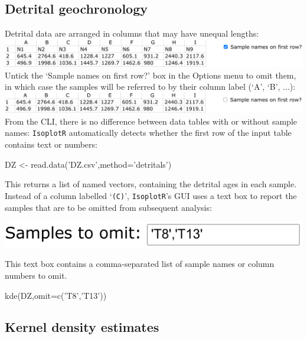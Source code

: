\begin{refsection}

\chapter{Detrital geochronology}\label{ch:detrital-R}

Detrital data are arranged in columns that may have unequal lengths:\\

\noindent\includegraphics[width=\linewidth]{../figures/detritalInputTable.png}\\

Untick the `Sample names on first row?' box in the Options menu to
omit them, in which case the samples will be referred to by their
column label (`A', `B', ...):\\

\noindent\includegraphics[width=\linewidth]{../figures/detritalInputTableWithoutNames.png}\\

From the CLI, there is no difference between data tables with or
without sample names: \texttt{IsoplotR} automatically detects whether
the first row of the input table contains text or numbers:

\begin{console}
DZ <- read.data('DZ.csv',method='detritals')
\end{console}

This returns a list of named vectors, containing the detrital ages in
each sample. Instead of a column labelled `\texttt{(C)}',
\texttt{IsoplotR}'s GUI uses a text box to report the samples that are
to be omitted from subsequent analysis:

\noindent\begin{minipage}[t]{.4\linewidth}
\strut\vspace*{-\baselineskip}\newline
\includegraphics[width=\linewidth]{../figures/detritalOmit.png}
\end{minipage}
\begin{minipage}[t]{.6\linewidth}
This text box contains a comma-separated list of sample names or
column numbers to omit.
\end{minipage}

\begin{console}
kde(DZ,omit=c('T8','T13'))
\end{console}

\section{Kernel density estimates}



\printbibliography[heading=subbibliography]

\end{refsection}
